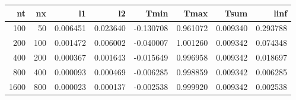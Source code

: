 \begin{tabular}{rrrrrrrr}
\toprule
   nt &   nx &        l1 &        l2 &      Tmin &      Tmax &      Tsum &      linf \\
\midrule
  100 &   50 &  0.006451 &  0.023640 & -0.130708 &  0.961072 &  0.009340 &  0.293788 \\
  200 &  100 &  0.001472 &  0.006002 & -0.040007 &  1.001260 &  0.009342 &  0.074348 \\
  400 &  200 &  0.000367 &  0.001643 & -0.015649 &  0.996958 &  0.009342 &  0.018697 \\
  800 &  400 &  0.000093 &  0.000469 & -0.006285 &  0.998859 &  0.009342 &  0.006285 \\
 1600 &  800 &  0.000023 &  0.000137 & -0.002538 &  0.999920 &  0.009342 &  0.002538 \\
\bottomrule
\end{tabular}
